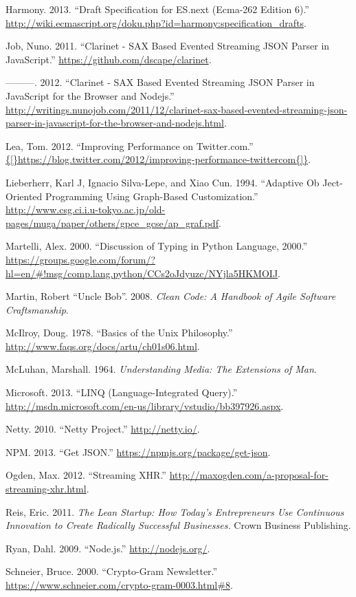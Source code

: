 \documentclass[12pt, ]{article}
\begin{document}
Harmony. 2013. ``Draft Specification for ES.next (Ecma-262 Edition 6).''
\url{http://wiki.ecmascript.org/doku.php?id=harmony:specification_drafts}.

Job, Nuno. 2011. ``Clarinet - SAX Based Evented Streaming JSON Parser in
JavaScript.'' \url{https://github.com/dscape/clarinet}.

---------. 2012. ``Clarinet - SAX Based Evented Streaming JSON Parser in
JavaScript for the Browser and Nodejs.''
\url{http://writings.nunojob.com/2011/12/clarinet-sax-based-evented-streaming-json-parser-in-javascript-for-the-browser-and-nodejs.html}.

Lea, Tom. 2012. ``Improving Performance on Twitter.com.''
\url{{[}https://blog.twitter.com/2012/improving-performance-twittercom{]}}.

Lieberherr, Karl J, Ignacio Silva-Lepe, and Xiao Cun. 1994. ``Adaptive
Ob Ject-Oriented Programming Using Graph-Based Customization.''
\url{http://www.csg.ci.i.u-tokyo.ac.jp/old-pages/muga/paper/others/gpce_gcse/ap_graf.pdf}.

Martelli, Alex. 2000. ``Discussion of Typing in Python Language, 2000.''
\url{https://groups.google.com/forum/?hl=en/\#!msg/comp.lang.python/CCs2oJdyuzc/NYjla5HKMOIJ}.

Martin, Robert ``Uncle Bob''. 2008. \emph{Clean Code: A Handbook of
Agile Software Craftsmanship}.

McIlroy, Doug. 1978. ``Basics of the Unix Philosophy.''
\url{http://www.faqs.org/docs/artu/ch01s06.html}.

McLuhan, Marshall. 1964. \emph{Understanding Media: The Extensions of
Man}.

Microsoft. 2013. ``LINQ (Language-Integrated Query).''
\url{http://msdn.microsoft.com/en-us/library/vstudio/bb397926.aspx}.

Netty. 2010. ``Netty Project.'' \url{http://netty.io/}.

NPM. 2013. ``Get JSON.'' \url{https://npmjs.org/package/get-json}.

Ogden, Max. 2012. ``Streaming XHR.''
\url{http://maxogden.com/a-proposal-for-streaming-xhr.html}.

Reis, Eric. 2011. \emph{The Lean Startup: How Today's Entrepreneurs Use
Continuous Innovation to Create Radically Successful Businesses.} Crown
Business Publishing.

Ryan, Dahl. 2009. ``Node.js.'' \url{http://nodejs.org/}.

Schneier, Bruce. 2000. ``Crypto-Gram Newsletter.''
\url{https://www.schneier.com/crypto-gram-0003.html\#8}.
\end{document}
